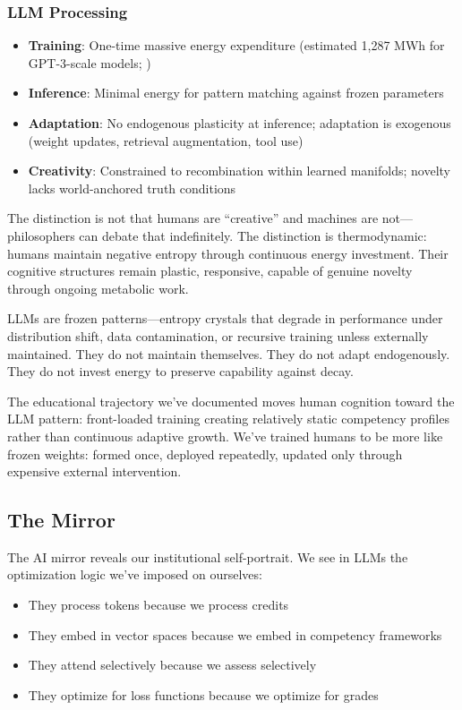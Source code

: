 \subsubsection{LLM Processing}
\begin{itemize}
\item \textbf{Training}: One-time massive energy expenditure (estimated 1,287 MWh for GPT-3-scale models; \citealt{patterson2021})
\item \textbf{Inference}: Minimal energy for pattern matching against frozen parameters
\item \textbf{Adaptation}: No endogenous plasticity at inference; adaptation is exogenous (weight updates, retrieval augmentation, tool use)
\item \textbf{Creativity}: Constrained to recombination within learned manifolds; novelty lacks world-anchored truth conditions
\end{itemize}

The distinction is not that humans are ``creative'' and machines are not---philosophers can debate that indefinitely. The distinction is thermodynamic: humans maintain negative entropy through continuous energy investment. Their cognitive structures remain plastic, responsive, capable of genuine novelty through ongoing metabolic work.

LLMs are frozen patterns---entropy crystals that degrade in performance under distribution shift, data contamination, or recursive training unless externally maintained. They do not maintain themselves. They do not adapt endogenously. They do not invest energy to preserve capability against decay.

The educational trajectory we've documented moves human cognition toward the LLM pattern: front-loaded training creating relatively static competency profiles rather than continuous adaptive growth. We've trained humans to be more like frozen weights: formed once, deployed repeatedly, updated only through expensive external intervention.

\subsection{The Mirror}

The AI mirror reveals our institutional self-portrait. We see in LLMs the optimization logic we've imposed on ourselves:

\begin{itemize}
\item They process tokens because we process credits
\item They embed in vector spaces because we embed in competency frameworks  
\item They attend selectively because we assess selectively
\item They optimize for loss functions because we optimize for grades
\end{itemize}

